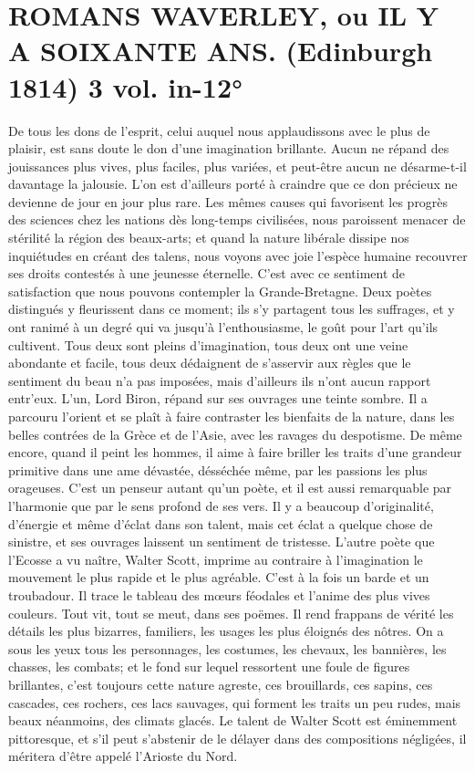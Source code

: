 \setcounter{page}{532}
\section{ROMANS \large{WAVERLEY, ou IL Y A SOIXANTE ANS. (Edinburgh 1814) 3 vol. in-12°}}
De tous les dons de l'esprit, celui auquel nous applaudissons avec le plus de plaisir, est sans doute le don d'une imagination brillante. Aucun ne répand des jouissances plus vives, plus faciles, plus variées, et peut-être aucun ne désarme-t-il davantage la jalousie. L'on est d'ailleurs porté à craindre que ce don précieux ne devienne de jour en jour plus rare. Les mêmes causes qui favorisent les progrès des sciences chez les nations dès long-temps civilisées, nous paroissent menacer de stérilité la région des beaux-arts; et quand la nature libérale dissipe nos inquiétudes en créant des talens, nous voyons avec joie l'espèce humaine recouvrer ses droits contestés à une jeunesse éternelle.
C'est avec ce sentiment de satisfaction que nous pouvons contempler la Grande-Bretagne. Deux poètes distingués y fleurissent dans ce moment; ils s'y partagent tous les suffrages,\setcounter{page}{533} et y ont ranimé à un degré qui va jusqu'à l'enthousiasme, le goût pour l'art qu'ils cultivent. Tous deux sont pleins d'imagination, tous deux ont une veine abondante et facile, tous deux dédaignent de s'asservir aux règles que le sentiment du beau n'a pas imposées, mais d'ailleurs ils n'ont aucun rapport entr'eux. L'un, Lord Biron, répand sur ses ouvrages une teinte sombre. Il a parcouru l'orient et se plaît à faire contraster les bienfaits de la nature, dans les belles contrées de la Grèce et de l'Asie, avec les ravages du despotisme. De même encore, quand il peint les hommes, il aime à faire briller les traits d'une grandeur primitive dans une ame dévastée, désséchée même, par les passions les plus orageuses. C'est un penseur autant qu'un poète, et il est aussi remarquable par l'harmonie que par le sens profond de ses vers. Il y a beaucoup d'originalité, d'énergie et même d'éclat dans son talent, mais cet éclat a quelque chose de sinistre, et ses ouvrages laissent un sentiment de tristesse. L'autre poète que l'Ecosse a vu naître, Walter Scott, imprime au contraire à l'imagination le mouvement le plus rapide et le plus agréable. C'est à la fois un barde et un troubadour. Il trace le tableau des mœurs féodales et l'anime des plus vives couleurs. Tout vit,\setcounter{page}{534} tout se meut, dans ses poëmes. Il rend frappans de vérité les détails les plus bizarres, familiers, les usages les plus éloignés des nôtres. On a sous les yeux tous les personnages, les costumes, les chevaux, les bannières, les chasses, les combats; et le fond sur lequel ressortent une foule de figures brillantes, c'est toujours cette nature agreste, ces brouillards, ces sapins, ces cascades, ces rochers, ces lacs sauvages, qui forment les traits un peu rudes, mais beaux néanmoins, des climats glacés. Le talent de Walter Scott est éminemment pittoresque, et s'il peut s'abstenir de le délayer dans des compositions négligées, il méritera d'être appelé l'Arioste du Nord.
